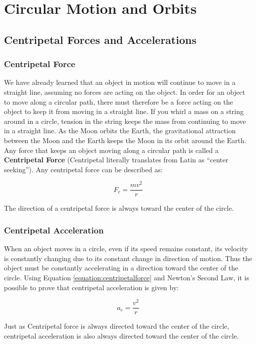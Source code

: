 \chapter{Circular Motion and Orbits}
	\section{Centripetal Forces and Accelerations}
	\subsection{Centripetal Force} 
	We have already learned that an object in motion will continue to move in a straight line, assuming no forces are acting on the object.  In order for an object to move along a circular path, there must therefore be a force acting on the object to keep it from moving in a straight line.  If you whirl a mass on a string around in a circle, tension in the string keeps the mass from continuing to move in a straight line.  As the Moon orbits the Earth, the gravitational attraction between the Moon and the Earth keeps the Moon in its orbit around the Earth.  Any force that keeps an object moving along a circular path is called a \textbf{Centripetal Force} (Centripetal literally translates from Latin as ``center seeking'').  Any centripetal force can be described as:
	
	\begin{mdframed}[backgroundcolor=orange!20!white]
	\begin{equation}
	F_c = \frac{mv^2}{r}
	\label{equation:centripetalforce}
	\end{equation}
		
	\end{mdframed}
	

	The direction of a centripetal force is always toward the center of the circle.  

	
	\subsection{Centripetal Acceleration} 
	
	
	
	When an object moves in a circle, even if its speed remains constant, its velocity is constantly changing due to its constant change in direction of motion.  Thus the object must be constantly accelerating in a direction toward the center of the circle.  Using Equation \ref{equation:centripetalforce} and Newton's Second Law, it is possible to prove that centripetal acceleration is given by:			
	\begin{mdframed}[backgroundcolor=orange!20!white]
	\begin{equation}
	a_c = \frac{v^2}{r}
	\end{equation}
	\end{mdframed}
	Just as Centripetal force is always directed toward the center of the circle, centripetal acceleration is also always directed toward the center of the circle.  
	
